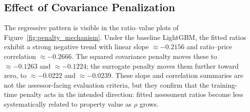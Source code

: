 \documentclass[12pt]{article}
\theoremstyle{plain}
\theoremstyle{definition}
\newcommand{\1}{\mathbf{1}}
\begin{document}
\subsection{Effect of Covariance Penalization}


The regressive pattern is visible in the ratio--value plots of Figure~\ref{fig:penalty_mechanism}. Under the baseline LightGBM, the fitted ratios exhibit a strong negative trend with linear slope $\approx -0.2156$ and ratio--price correlation $\approx -0.2666$. The squared covariance penalty moves these to $\approx -0.1263$ and $\approx -0.1224$; the surrogate penalty moves them further toward zero, to $\approx -0.0222$ and $\approx -0.0239$. These slope and correlation summaries are not the assessor-facing evaluation criteria, but they confirm that the training-time penalty acts in the intended direction: fitted assessment ratios become less systematically related to property value as $\rho$ grows.


\end{document}

